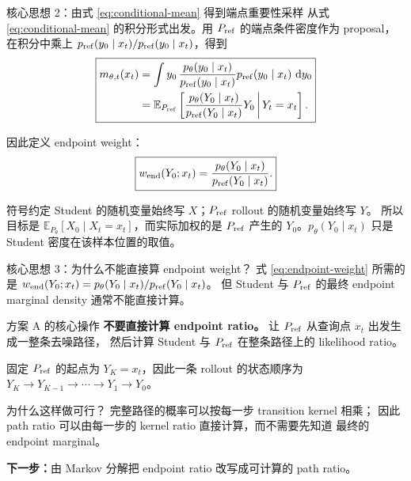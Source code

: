 \documentclass[10pt,aspectratio=169]{beamer}
\newcommand{\E}{\mathbb E}
\newcommand{\dd}{\,\mathrm d}
\begin{document}
\begin{frame}{核心思想 2：由式 \eqref{eq:conditional-mean} 得到端点重要性采样}
\small
从式 \eqref{eq:conditional-mean} 的积分形式出发。用 $P_{\rm ref}$ 的端点条件密度作为 proposal，
在积分中乘上
$p_{\rm ref}(y_0\mid x_t)/p_{\rm ref}(y_0\mid x_t)$，得到
\begin{equation}
\boxed{
\begin{aligned}
m_{\theta,t}(x_t)
&=
\int
y_0\,
\frac{p_\theta(y_0\mid x_t)}
     {p_{\rm ref}(y_0\mid x_t)}
p_{\rm ref}(y_0\mid x_t)\,\dd y_0  \\
&=
\E_{P_{\rm ref}}
\left[
\frac{p_\theta(Y_0\mid x_t)}
     {p_{\rm ref}(Y_0\mid x_t)}
Y_0
\,\middle|\,Y_t=x_t
\right].
\end{aligned}
}
\label{eq:endpoint-is}
\end{equation}

因此定义 endpoint weight：
\begin{equation}
\boxed{
w_{\rm end}(Y_0;x_t)
=
\frac{p_\theta(Y_0\mid x_t)}
     {p_{\rm ref}(Y_0\mid x_t)} .
}
\label{eq:endpoint-weight}
\end{equation}

\begin{block}{符号约定}
Student 的随机变量始终写 $X$；$P_{\rm ref}$ rollout 的随机变量始终写 $Y$。
所以目标是 $\E_{P_\theta}[X_0\mid X_t=x_t]$，而实际加权的是 $P_{\rm ref}$
产生的 $Y_0$。$p_\theta(Y_0\mid x_t)$ 只是 Student 密度在该样本位置的取值。
\end{block}
\end{frame}

\begin{frame}{核心思想 3：为什么不能直接算 endpoint weight？}
\small
式 \eqref{eq:endpoint-weight} 所需的是
$w_{\rm end}(Y_0;x_t)=p_\theta(Y_0\mid x_t)/p_{\rm ref}(Y_0\mid x_t)$。
但 Student 与 $P_{\rm ref}$ 的最终 endpoint marginal density 通常不能直接计算。

\begin{block}{方案 A 的核心操作}
\textbf{不要直接计算 endpoint ratio。}
让 $P_{\rm ref}$ 从查询点 $x_t$ 出发生成一整条去噪路径，
然后计算 Student 与 $P_{\rm ref}$ 在整条路径上的 likelihood ratio。
\end{block}

固定 $P_{\rm ref}$ 的起点为 $Y_K=x_t$，因此一条 rollout 的状态顺序为
$Y_K\to Y_{K-1}\to\cdots\to Y_1\to Y_0$。

\begin{block}{为什么这样做可行？}
完整路径的概率可以按每一步 transition kernel 相乘；
因此 path ratio 可以由每一步的 kernel ratio 直接计算，而不需要先知道
最终的 endpoint marginal。
\end{block}

\textbf{下一步：}由 Markov 分解把 endpoint ratio 改写成可计算的 path ratio。
\end{frame}
\end{document}
